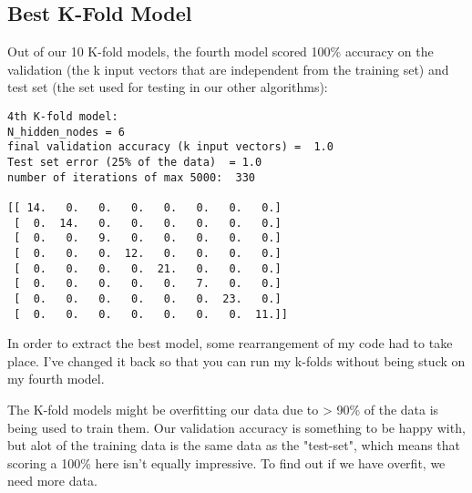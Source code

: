 \documentclass[10pt, a4paper]{article}
\begin{document}
\subsection{Best K-Fold Model}
Out of our 10 K-fold models, the fourth model scored 100\% accuracy on the validation (the k input vectors that are independent from the training set) and test set (the set used for testing in our other algorithms):
\begin{lstlisting}
4th K-fold model:
N_hidden_nodes = 6
final validation accuracy (k input vectors) =  1.0
Test set error (25% of the data)  = 1.0
number of iterations of max 5000:  330

[[ 14.   0.   0.   0.   0.   0.   0.   0.]
 [  0.  14.   0.   0.   0.   0.   0.   0.]
 [  0.   0.   9.   0.   0.   0.   0.   0.]
 [  0.   0.   0.  12.   0.   0.   0.   0.]
 [  0.   0.   0.   0.  21.   0.   0.   0.]
 [  0.   0.   0.   0.   0.   7.   0.   0.]
 [  0.   0.   0.   0.   0.   0.  23.   0.]
 [  0.   0.   0.   0.   0.   0.   0.  11.]]
\end{lstlisting}
In order to extract the best model, some rearrangement of my code had to take place. I've changed it back so that you can run my k-folds without being stuck on my fourth model.

The K-fold models might be overfitting our data due to > 90\% of the data is being used to train them. Our validation accuracy is something to be happy with, but alot of the training data is the same data
as the "test-set", which means that scoring a 100\% here isn't equally impressive. To find out if we have overfit, we need more data. 
\end{document}

